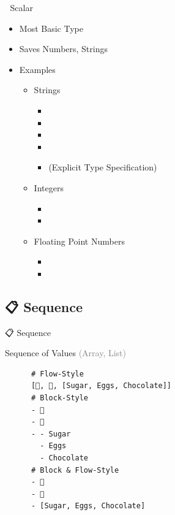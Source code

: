 \documentclass{beamer}
\begin{document}
\begin{frame}[fragile]{📏 Scalar}
  \begin{itemize}
    \item Most Basic Type
    \item Saves Numbers, Strings
    \item Examples
    \begin{itemize}
      \item Strings
      \begin{itemize}
        \item {}
        \item {}
        \item {}
        \item {}
        \item {} (Explicit Type Specification)
      \end{itemize}
      \item Integers
      \begin{itemize}
        \item {}
        \item {}
      \end{itemize}
      \item Floating Point Numbers
      \begin{itemize}
        \item {}
        \item {}
      \end{itemize}
    \end{itemize}
  \end{itemize}
\end{frame}

\subsection{📋 Sequence}

\begin{frame}[fragile]{📋 Sequence}
  \begin{block}{Sequence of Values \textcolor{gray}{(Array, List)}}~\\
    \begin{verbatim}
      # Flow-Style
      [🍎, 🍊, [Sugar, Eggs, Chocolate]]
      # Block-Style
      - 🍎
      - 🍊
      - - Sugar
        - Eggs
        - Chocolate
      # Block & Flow-Style
      - 🍎
      - 🍊
      - [Sugar, Eggs, Chocolate]
    \end{verbatim}
  \end{block}
\end{frame}
\end{document}
